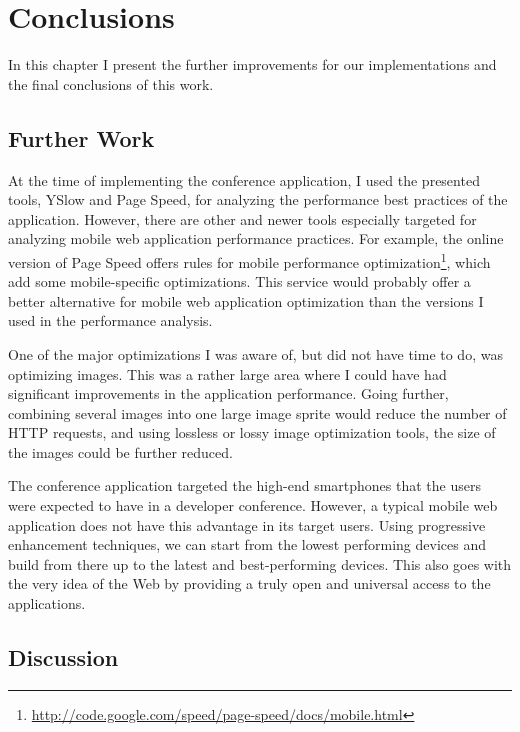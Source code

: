 \chapter{Conclusions}
\label{chapter:conclusions}

In this chapter I present the further improvements for our
implementations and the final conclusions of this work.

\section{Further Work}

At the time of implementing the conference application, I used the
presented tools, YSlow and Page Speed, for analyzing the performance
best practices of the application. However, there are other and newer
tools especially targeted for analyzing mobile web application
performance practices. For example, the online version of Page Speed
offers rules for mobile performance
optimization\footnote{\url{http://code.google.com/speed/page-speed/docs/mobile.html}},
which add some mobile-specific optimizations. This service would
probably offer a better alternative for mobile web application
optimization than the versions I used in the performance analysis.

One of the major optimizations I was aware of, but did not have time
to do, was optimizing images. This was a rather large area where I
could have had significant improvements in the application
performance. Going further, combining several images into one large
image sprite would reduce the number of HTTP requests, and using
lossless or lossy image optimization tools, the size of the images
could be further reduced.

The conference application targeted the high-end smartphones that the
users were expected to have in a developer conference. However, a
typical mobile web application does not have this advantage in its
target users. Using progressive enhancement techniques, we can start
from the lowest performing devices and build from there up to the
latest and best-performing devices. This also goes with the very idea
of the Web by providing a truly open and universal access to the
applications.

\section{Discussion}


